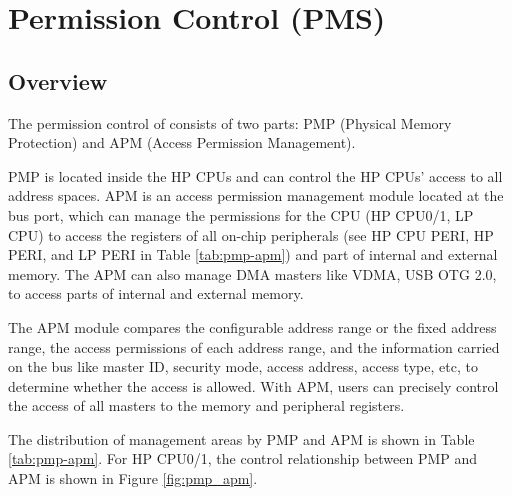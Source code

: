 \documentclass[main\_\_EN.tex]{subfiles}
\begin{document}

\ifglobal
\else
    {\let\clearpage\relax \listoftodos}
    {\let\clearpage\relax \listofdonetodos}
    \tableofcontents
\fi



\hypertarget{permctrl}{}
\chapter{Permission Control (PMS)}
\label{mod:permctrl}

\section{Overview}

The permission control of \chipname{} consists of two parts: PMP (Physical Memory Protection) and APM (Access Permission Management).

PMP is located inside the HP CPUs and can control the HP CPUs' access to all address spaces. APM is an access permission management module located at the bus port, which can manage the permissions for the CPU (HP CPU0/1, LP CPU) to access the registers of all on-chip peripherals (see HP CPU PERI, HP PERI, and LP PERI in Table \ref{tab:pmp-apm}) and part of internal and external memory. The APM can also manage DMA masters like VDMA, USB OTG 2.0, to access parts of internal and external memory.

The APM module compares the configurable address range or the fixed address range, the access permissions of each address range, and the information carried on the bus like master ID, security mode, access address, access type, etc, to determine whether the access is allowed. With APM, users can precisely control the access of all masters to the memory and peripheral registers.

The distribution of management areas by PMP and APM is shown in Table \ref{tab:pmp-apm}. For HP CPU0/1, the control relationship between PMP and APM is shown in Figure \ref{fig:pmp_apm}.
\end{document}
